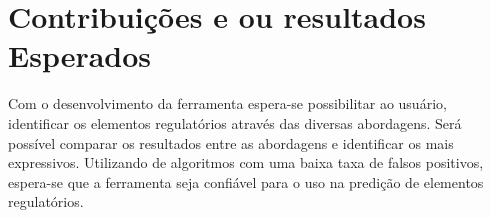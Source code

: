 \chapter{Contribuições e ou resultados Esperados}
Com o desenvolvimento da ferramenta espera-se possibilitar ao usuário, identificar os elementos regulatórios através das diversas abordagens. Será possível comparar os resultados entre as abordagens e identificar os mais expressivos. Utilizando de algoritmos com uma baixa taxa de falsos positivos, espera-se que a ferramenta seja confiável para o uso na predição de elementos regulatórios.